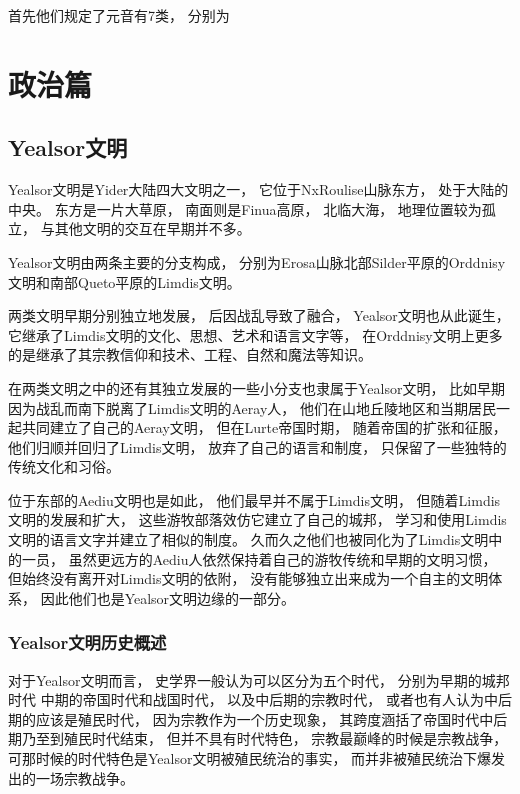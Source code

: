 \documentclass[UTF8,12pt,draft]{ctexbook}
\begin{document}
            首先他们规定了元音有7类，
            分别为

            

\part{政治篇}   
    \chapter{Yealsor文明}

        Yealsor文明是Yider大陆四大文明之一，
        它位于NxRoulise山脉东方，
        处于大陆的中央。
        东方是一片大草原，
        南面则是Finua高原，
        北临大海，
        地理位置较为孤立，
        与其他文明的交互在早期并不多。

        Yealsor文明由两条主要的分支构成，
        分别为Erosa山脉北部Silder平原的Orddnisy文明和南部Queto平原的Limdis文明。

        两类文明早期分别独立地发展，
        后因战乱导致了融合，
        Yealsor文明也从此诞生，
        它继承了Limdis文明的文化、思想、艺术和语言文字等，
        在Orddnisy文明上更多的是继承了其宗教信仰和技术、工程、自然和魔法等知识。

        在两类文明之中的还有其独立发展的一些小分支也隶属于Yealsor文明，
        比如早期因为战乱而南下脱离了Limdis文明的Aeray人，
        他们在山地丘陵地区和当期居民一起共同建立了自己的Aeray文明，
        但在Lurte帝国时期，
        随着帝国的扩张和征服，
        他们归顺并回归了Limdis文明，
        放弃了自己的语言和制度，
        只保留了一些独特的传统文化和习俗。

        位于东部的Aediu文明也是如此，
        他们最早并不属于Limdis文明，
        但随着Limdis文明的发展和扩大，
        这些游牧部落效仿它建立了自己的城邦，
        学习和使用Limdis文明的语言文字并建立了相似的制度。
        久而久之他们也被同化为了Limdis文明中的一员，
        虽然更远方的Aediu人依然保持着自己的游牧传统和早期的文明习惯，
        但始终没有离开对Limdis文明的依附，
        没有能够独立出来成为一个自主的文明体系，
        因此他们也是Yealsor文明边缘的一部分。

        \section{Yealsor文明历史概述}

            对于Yealsor文明而言，
            史学界一般认为可以区分为五个时代，
            分别为早期的城邦时代
            中期的帝国时代和战国时代，
            以及中后期的宗教时代，
            或者也有人认为中后期的应该是殖民时代，
            因为宗教作为一个历史现象，
            其跨度涵括了帝国时代中后期乃至到殖民时代结束，
            但并不具有时代特色，
            宗教最巅峰的时候是宗教战争，
            可那时候的时代特色是Yealsor文明被殖民统治的事实，
            而并非被殖民统治下爆发出的一场宗教战争。
\end{document}
